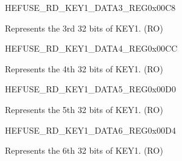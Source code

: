 \begin{register}{H}{EFUSE\_RD\_KEY1\_DATA3\_REG}{0x00C8}\label{regdesc:EFUSERDKEY1DATA3REG}
%
\regnewline%
\begin{regdesc}\begin{reglist}
\label{fielddesc:EFUSEKEY1DATA3}\item [EFUSE\_KEY1\_DATA3] Represents the 3rd 32 bits of KEY1. (RO)
\end{reglist}\end{regdesc}
\end{register}


\begin{register}{H}{EFUSE\_RD\_KEY1\_DATA4\_REG}{0x00CC}\label{regdesc:EFUSERDKEY1DATA4REG}
%
\regnewline%
\begin{regdesc}\begin{reglist}
\label{fielddesc:EFUSEKEY1DATA4}\item [EFUSE\_KEY1\_DATA4] Represents the 4th 32 bits of KEY1. (RO)
\end{reglist}\end{regdesc}
\end{register}


\begin{register}{H}{EFUSE\_RD\_KEY1\_DATA5\_REG}{0x00D0}\label{regdesc:EFUSERDKEY1DATA5REG}
%
\regnewline%
\begin{regdesc}\begin{reglist}
\label{fielddesc:EFUSEKEY1DATA5}\item [EFUSE\_KEY1\_DATA5] Represents the 5th 32 bits of KEY1. (RO)
\end{reglist}\end{regdesc}
\end{register}


\begin{register}{H}{EFUSE\_RD\_KEY1\_DATA6\_REG}{0x00D4}\label{regdesc:EFUSERDKEY1DATA6REG}
%
\regnewline%
\begin{regdesc}\begin{reglist}
\label{fielddesc:EFUSEKEY1DATA6}\item [EFUSE\_KEY1\_DATA6] Represents the 6th 32 bits of KEY1. (RO)
\end{reglist}\end{regdesc}
\end{register}


